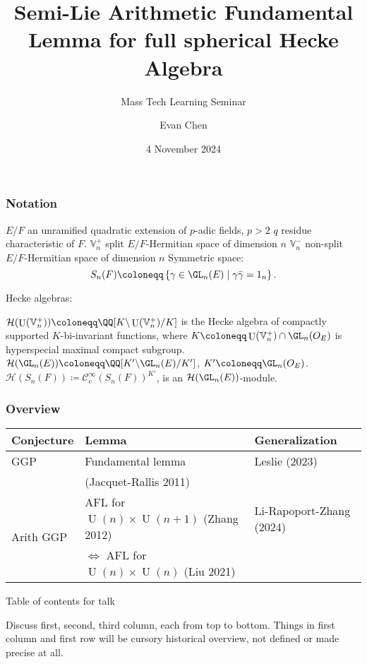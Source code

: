 \documentclass[11pt]{beamer}
\title[Semi-Lie AFL for full Hecke algebra]{Semi-Lie Arithmetic Fundamental Lemma for full spherical Hecke Algebra}
\subtitle{Mass Tech Learning Seminar}
\author{Evan Chen}
\date{4 November 2024}
\DeclareMathOperator{\U}{U}
\newcommand{\HH}{\mathcal{H}}
\newcommand{\VV}{\mathbb{V}}
\renewcommand{\OO}{O}
\begin{document}
\begin{frame}
  \maketitle
\end{frame}

\begin{frame}
  \frametitle{Notation}
  \begin{itemize}
  \ii $E/F$ an unramified quadratic extension of $p$-adic fields, $p > 2$
  \ii $q$ residue characteristic of $F$.
  \ii $\VV_n^+$ split $E/F$-Hermitian space of dimension $n$
  \ii $\VV_n^-$ non-split $E/F$-Hermitian space of dimension $n$
  \ii Symmetric space:
  \[ S_n(F) \coloneqq \left\{ \gamma \in \GL_n(E) \mid \gamma\bar\gamma = 1_n \right\} . \]
  \end{itemize}
  Hecke algebras:
  \begin{itemize}
  \ii $\HH(\U(\VV_n^+)) \coloneqq \QQ[K \backslash \U(\VV_n^+) \slash K]$
  is the Hecke algebra of compactly supported $K$-bi-invariant functions,
  where $K \coloneqq \U(\VV_n^+) \cap \GL_n(\OO_E)$ is hyperspecial maximal compact subgroup.
  \ii $\HH(\GL_n(E)) \coloneqq \QQ[K' \backslash \GL_n(E) \slash K']$, $K' \coloneqq \GL_n(\OO_E)$.
  \ii $\HH(S_n(F)) \coloneqq \mathcal C^\infty_{\text{c}} (S_n(F))^{K'}$,
  is an $\HH(\GL_n(E))$-module.
  \end{itemize}
\end{frame}


\begin{frame}
  \frametitle{Overview}
  \centering
  \begin{tabular}{lp{12em}p{8em}}
    \toprule
    \textbf{Conjecture} & \textbf{Lemma} & \textbf{Generalization} \\
    \midrule
    GGP & Fundamental lemma & Leslie (2023) \\ & (Jacquet-Rallis 2011) \\
    \midrule
    \multirow{2}{*}[-1em]{Arith GGP} & AFL for $\U(n) \times \U(n+1)$ (Zhang 2012) & Li-Rapoport-Zhang (2024) \\ \cline{2-3}
    & $\iff$ AFL for $\U(n) \times \U(n)$ (Liu 2021) & 🤔 \\
    \bottomrule
  \end{tabular}
  \begin{block}{Table of contents for talk}
    \begin{itemize}
    \ii Discuss first, second, third column, each from top to bottom.
    \ii Things in first column and first row will be cursory historical overview,
      not defined or made precise at all.
    \end{itemize}
  \end{block}
\end{frame}
\end{document}
